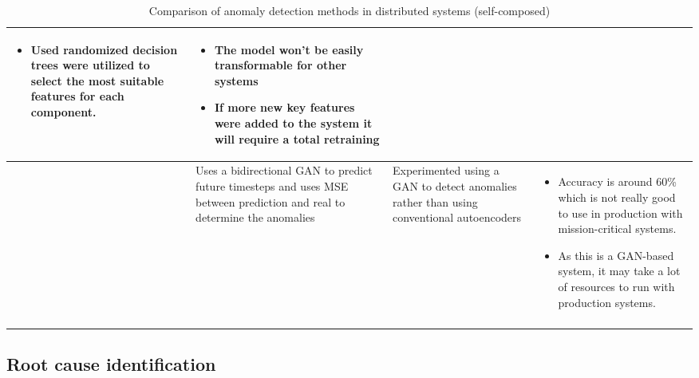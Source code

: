 \begin{longtable}{| p{20mm} | p{43mm} | p{43mm} | p{43mm} |}
\begin{itemize}[leftmargin=*,noitemsep,nolistsep]
    \item Used randomized decision trees were utilized to select the most suitable features for each component.
  \vspace{-7mm}
  \end{itemize} &
  \vspace{-8mm}
  \begin{itemize}[leftmargin=*,noitemsep,nolistsep] 
    \item The model won't be easily transformable for other systems
    \item If more new key features were added to the system it will require a total retraining
  \vspace{-7mm}
  \end{itemize} \\ \hline
  \cite{kumarage2019generative} &
  Uses a bidirectional GAN to predict future timesteps and uses MSE between prediction and real to determine the anomalies &
  Experimented using a GAN to detect anomalies rather than using conventional autoencoders &
  \vspace{-8mm}
  \begin{itemize}[leftmargin=*,noitemsep,nolistsep] 
    \item Accuracy is around 60\% which is not really good to use in production with mission-critical systems.
    \item As this is a GAN-based system, it may take a lot of resources to run with production systems.
  \vspace{-7mm}
  \end{itemize} \\ \hline
  \caption{Comparison of anomaly detection methods in distributed systems (self-composed)}
\end{longtable}

\subsection{Root cause identification}

